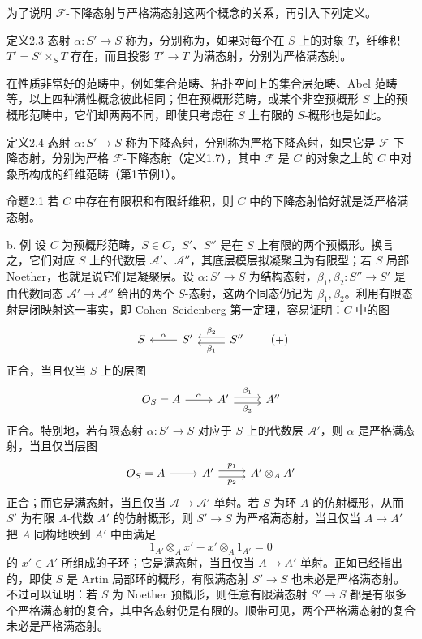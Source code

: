 为了说明 $\mathcal F$-下降态射与严格满态射这两个概念的关系，再引入下列定义。
\begin{statement}{定义2.3}
态射 $\alpha:S'\to S$ 称为，分别称为，如果对每个在 $S$ 上的对象 $T$，纤维积 $T'=S'\times_ST$ 存在，而且投影 $T'\to T$ 为满态射，分别为严格满态射。
\end{statement}
在性质非常好的范畴中，例如集合范畴、拓扑空间上的集合层范畴、Abel 范畴等，以上四种满性概念彼此相同；但在预概形范畴，或某个非空预概形 $S$ 上的预概形范畴中，它们却两两不同，即使只考虑在 $S$ 上有限的 $S$-概形也是如此。
\begin{statement}{定义2.4}
态射 $\alpha:S'\to S$ 称为下降态射，分别称为严格下降态射，如果它是 $\mathcal F$-下降态射，分别为严格 $\mathcal F$-下降态射（定义1.7），其中 $\mathcal F$ 是 $C$ 的对象之上的 $C$ 中对象所构成的纤维范畴（第1节例1）。
\end{statement}
\begin{statement}{命题2.1}
若 $C$ 中存在有限积和有限纤维积，则 $C$ 中的下降态射恰好就是泛严格满态射。
\end{statement}
\begin{statement}{b. 例}
设 $C$ 为预概形范畴，$S\in C$，$S'$、$S''$ 是在 $S$ 上有限的两个预概形。换言之，它们对应 $S$ 上的代数层 $\mathcal A'$、$\mathcal A''$，其底层模层拟凝聚且为有限型；若 $S$ 局部 Noether，也就是说它们是凝聚层。设 $\alpha:S'\to S$ 为结构态射，$\beta_1,\beta_2:S''\to S'$ 是由代数同态 $\mathcal A'\to\mathcal A''$ 给出的两个 $S$-态射，这两个同态仍记为 $\beta_1,\beta_2$。利用有限态射是闭映射这一事实，即 Cohen--Seidenberg 第一定理，容易证明：$C$ 中的图
\[
\begin{tikzcd}
S&S'\arrow[l,"\alpha"']&S''\arrow[l,shift left=.6ex,"\beta_1"]\arrow[l,shift right=.6ex,"\beta_2"']
\end{tikzcd}\tag{+}
\]
正合，当且仅当 $S$ 上的层图
\[
\begin{tikzcd}
\mathcal O_S=\mathcal A\arrow[r,"\alpha"]&\mathcal A'\arrow[r,shift left=.6ex,"\beta_1"]\arrow[r,shift right=.6ex,"\beta_2"']&\mathcal A''
\end{tikzcd}
\]
正合。特别地，若有限态射 $\alpha:S'\to S$ 对应于 $S$ 上的代数层 $\mathcal A'$，则 $\alpha$ 是严格满态射，当且仅当层图
\[
\begin{tikzcd}
\mathcal O_S=\mathcal A\arrow[r]&\mathcal A'\arrow[r,shift left=.6ex,"p_1"]\arrow[r,shift right=.6ex,"p_2"']&\mathcal A'\otimes_{\mathcal A}\mathcal A'
\end{tikzcd}
\]
正合；而它是满态射，当且仅当 $\mathcal A\to\mathcal A'$ 单射。若 $S$ 为环 $A$ 的仿射概形，从而 $S'$ 为有限 $A$-代数 $A'$ 的仿射概形，则 $S'\to S$ 为严格满态射，当且仅当 $A\to A'$ 把 $A$ 同构地映到 $A'$ 中由满足
\[
1_{A'}\otimes_Ax'-x'\otimes_A1_{A'}=0
\]
的 $x'\in A'$ 所组成的子环；它是满态射，当且仅当 $A\to A'$ 单射。正如已经指出的，即使 $S$ 是 Artin 局部环的概形，有限满态射 $S'\to S$ 也未必是严格满态射。不过可以证明：若 $S$ 为 Noether 预概形，则任意有限满态射 $S'\to S$ 都是有限多个严格满态射的复合，其中各态射仍是有限的。顺带可见，两个严格满态射的复合未必是严格满态射。
\end{statement}

